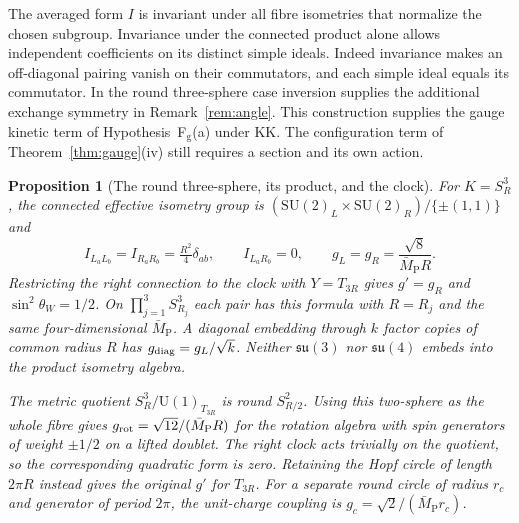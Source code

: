 \documentclass[aps,pra,onecolumn,superscriptaddress,nofootinbib,10pt]{revtex4-2}
\newtheorem{proposition}[theorem]{Proposition}
\theoremstyle{definition}
\theoremstyle{remark}
\newcommand{\SU}{\mathrm{SU}}
\begin{document}
The averaged form $I$ is invariant under all fibre isometries that
normalize the chosen subgroup. Invariance under the connected
product alone allows independent coefficients on its distinct
simple ideals. Indeed invariance makes an off-diagonal pairing
vanish on their commutators, and each simple ideal equals its
commutator. In the round three-sphere case inversion supplies
the additional exchange symmetry in Remark~\ref{rem:angle}.
This construction supplies the gauge kinetic term of
Hypothesis~F$_{\mathrm g}$(a) under KK. The configuration term of
Theorem~\ref{thm:gauge}(iv) still requires a section and its own action.

\begin{proposition}[The round three-sphere, its product, and the clock]\label{cr:s3}
For $K=S^3_R$, the connected effective isometry group is
$(\SU(2)_L\times\SU(2)_R)/\{\pm(1,1)\}$ and
\[
 I_{L_aL_b}=I_{R_aR_b}=\tfrac{R^2}{4}\delta_{ab},\qquad
 I_{L_aR_b}=0,\qquad
 g_L=g_R=\frac{\sqrt8}{\bar M_{\mathrm P}R}.
\]
Restricting the right connection to the clock with
$Y=T_{3R}$ gives $g'=g_R$ and $\sin^2\theta_W=1/2$.
On $\prod_{j=1}^3 S^3_{R_j}$ each pair has this formula with
$R=R_j$ and the same four-dimensional $\bar M_{\mathrm P}$.
A diagonal embedding through $k$ factor copies of common radius $R$
has $g_{\rm diag}=g_L/\sqrt k$. Neither $\mathfrak{su}(3)$ nor
$\mathfrak{su}(4)$ embeds into the product isometry algebra.

The metric quotient $S^3_R/\mathrm{U}(1)_{T_{3R}}$ is round
$S^2_{R/2}$. Using this two-sphere as the whole fibre gives
$g_{\rm rot}=\sqrt{12}/(\bar M_{\mathrm P}R)$ for the rotation
algebra with spin generators of weight $\pm1/2$ on a lifted doublet.
The right clock acts trivially on the quotient, so the corresponding
quadratic form is zero. Retaining the Hopf circle of length $2\pi R$
instead gives the original $g'$ for $T_{3R}$. For a separate round
circle of radius $r_c$ and generator of period $2\pi$, the unit-charge
coupling is $g_c=\sqrt2/(\bar M_{\mathrm P}r_c)$.
\end{proposition}
\end{document}

